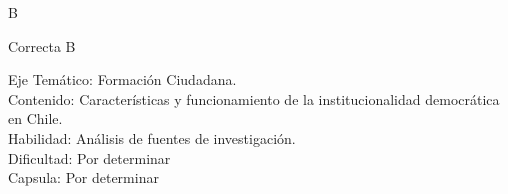\documentclass[letterpaper,11pt]{article}
\newcommand{\anchopregunta}{0.9\textwidth}
\begin{document}
\begin{enumerate}
\begin{minipage}{\anchopregunta}
\begin{key} B
\end{key} 
\begin{hint}
\end{hint}
\begin{answer} Correcta B \\
\end{answer}
\begin{info} %
\begin{flushleft}
Eje Temático: Formación Ciudadana.\\
Contenido: Características y funcionamiento de la institucionalidad democrática en Chile.\\
Habilidad: Análisis de fuentes de investigación.\\
Dificultad: Por determinar\\
Capsula: Por determinar \\
\end{flushleft} 
\end{info}
\end{minipage}\vfill$\;$ %


\end{enumerate}
\end{document}
